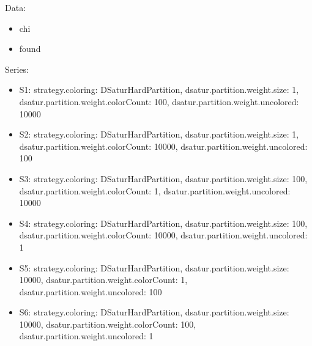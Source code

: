 \documentclass[landscape, 12pt]{report}
\begin{document}
	Data:
	\begin{itemize}
	\item chi
	\item found
	\end{itemize}
	Series:
	\begin{itemize}
	\item S1: strategy.coloring: DSaturHardPartition, dsatur.partition.weight.size: 1, dsatur.partition.weight.colorCount: 100, dsatur.partition.weight.uncolored: 10000
	\item S2: strategy.coloring: DSaturHardPartition, dsatur.partition.weight.size: 1, dsatur.partition.weight.colorCount: 10000, dsatur.partition.weight.uncolored: 100
	\item S3: strategy.coloring: DSaturHardPartition, dsatur.partition.weight.size: 100, dsatur.partition.weight.colorCount: 1, dsatur.partition.weight.uncolored: 10000
	\item S4: strategy.coloring: DSaturHardPartition, dsatur.partition.weight.size: 100, dsatur.partition.weight.colorCount: 10000, dsatur.partition.weight.uncolored: 1
	\item S5: strategy.coloring: DSaturHardPartition, dsatur.partition.weight.size: 10000, dsatur.partition.weight.colorCount: 1, dsatur.partition.weight.uncolored: 100
	\item S6: strategy.coloring: DSaturHardPartition, dsatur.partition.weight.size: 10000, dsatur.partition.weight.colorCount: 100, dsatur.partition.weight.uncolored: 1
	\end{itemize}
\end{document}
